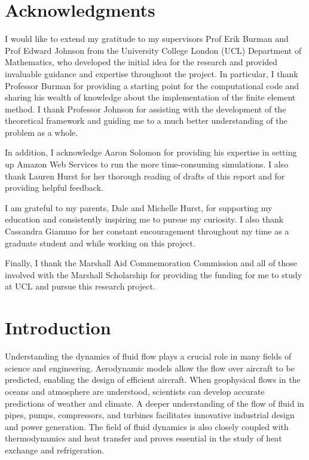 \documentclass[12pt]{article}
\begin{document}
\newpage

\section*{Acknowledgments}

I would like to extend my gratitude to my supervisors Prof Erik Burman and Prof Edward Johnson from the University College London (UCL) Department of Mathematics, who developed the initial idea for the research and provided invaluable guidance and expertise throughout the project. In particular, I thank Professor Burman for providing a starting point for the computational code and sharing his wealth of knowledge about the implementation of the finite element method. I thank Professor Johnson for assisting with the development of the theoretical framework and guiding me to a much better understanding of the problem as a whole.

In addition, I acknowledge Aaron Solomon for providing his expertise in setting up Amazon Web Services to run the more time-consuming simulations. I also thank Lauren Hurst for her thorough reading of drafts of this report and for providing helpful feedback.

I am grateful to my parents, Dale and Michelle Hurst, for supporting my education and consistently inspiring me to pursue my curiosity. I also thank Cassandra Giammo for her constant encouragement throughout my time as a graduate student and while working on this project.

Finally, I thank the Marshall Aid Commemoration Commission and all of those involved with the Marshall Scholarship for providing the funding for me to study at UCL and pursue this research project.

\newpage


\tableofcontents

\newpage


\section{Introduction}

Understanding the dynamics of fluid flow plays a crucial role in many fields of science and engineering. Aerodynamic models allow the flow over aircraft to be predicted, enabling the design of efficient aircraft. When geophysical flows in the oceans and atmosphere are understood, scientists can develop accurate predictions of weather and climate. A deeper understanding of the flow of fluid in pipes, pumps, compressors, and turbines facilitates innovative industrial design and power generation. The field of fluid dynamics is also closely coupled with thermodynamics and heat transfer and proves essential in the study of heat exchange and refrigeration.
\end{document}
